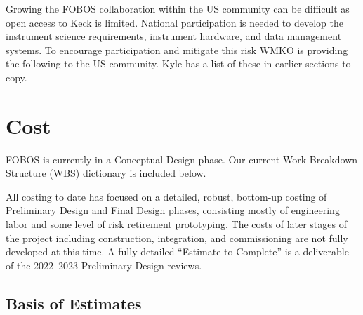 \documentclass[oneside,11pt]{amsart}
\begin{document}
Growing the FOBOS collaboration within the US community can be
difficult as open access to Keck is limited. National participation
is needed to develop the instrument science requirements, instrument
hardware, and data management systems. To encourage participation and
mitigate this risk WMKO is providing the following to the US
community. Kyle has a list of these in earlier sections to copy.




\section{Cost}
\label{sec:cost}






FOBOS is currently in a Conceptual Design phase. Our current Work
Breakdown Structure (WBS) dictionary is included below.

All costing to date has focused on a detailed, robust, bottom-up
costing of Preliminary Design and Final Design phases, consisting
mostly of engineering labor and some level of risk retirement
prototyping. The costs of later stages of the project including
construction, integration, and commissioning are not fully developed
at this time. A fully detailed ``Estimate to Complete''  is a deliverable of the 2022--2023 Preliminary Design reviews.

\subsection{Basis of Estimates}
\end{document}
